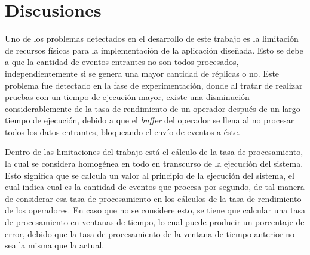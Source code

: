 \section{Discusiones}


\normalsize{Uno de los problemas detectados en el desarrollo de este trabajo es la limitaci\'on de recursos f\'isicos para la implementaci\'on de la aplicaci\'on dise\~nada.} Esto se debe a que la cantidad de eventos entrantes no son todos procesados, independientemente si se genera una mayor cantidad de r\'eplicas o no. Este problema fue detectado en la fase de experimentaci\'on, donde al tratar de realizar pruebas con un tiempo de ejecuci\'on mayor, existe una disminuci\'on considerablemente de la tasa de rendimiento de un operador despu\'es de un largo tiempo de ejecuci\'on, debido a que el \textit{buffer} del operador se llena al no procesar todos los datos entrantes, bloqueando el env\'io de eventos a \'este.


Dentro de las limitaciones del trabajo est\'a \normalsize{el c\'alculo de la tasa de procesamiento, la cual se considera homog\'enea en todo en transcurso de la ejecuci\'on del sistema. Esto significa que se calcula un valor al principio de la ejecuci\'on del sistema, el cual indica cual es la cantidad de eventos que procesa por segundo, de tal manera de considerar esa tasa de procesamiento en los c\'alculos de la tasa de rendimiento de los operadores. En caso que no se considere esto, se tiene que calcular una tasa de procesamiento en ventanas de tiempo, lo cual puede producir un porcentaje de error, debido que la tasa de procesamiento de la ventana de tiempo anterior no sea la misma que la actual.}

